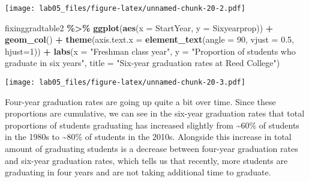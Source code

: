 \documentclass[
]{article}
\newenvironment{Shaded}{\begin{snugshade}}{\end{snugshade}}
\newcommand{\AttributeTok}[1]{\textcolor[rgb]{0.13,0.29,0.53}{#1}}
\newcommand{\DecValTok}[1]{\textcolor[rgb]{0.00,0.00,0.81}{#1}}
\newcommand{\FloatTok}[1]{\textcolor[rgb]{0.00,0.00,0.81}{#1}}
\newcommand{\FunctionTok}[1]{\textcolor[rgb]{0.13,0.29,0.53}{\textbf{#1}}}
\newcommand{\NormalTok}[1]{#1}
\newcommand{\SpecialCharTok}[1]{\textcolor[rgb]{0.81,0.36,0.00}{\textbf{#1}}}
\newcommand{\StringTok}[1]{\textcolor[rgb]{0.31,0.60,0.02}{#1}}
\begin{document}
\texttt{[image: lab05\_files/figure-latex/unnamed-chunk-20-2.pdf]}

\begin{Shaded}
\begin{Highlighting}[]
\NormalTok{fixinggradtable2 }\SpecialCharTok{\%\textgreater{}\%}
  \FunctionTok{ggplot}\NormalTok{(}\FunctionTok{aes}\NormalTok{(}\AttributeTok{x =}\NormalTok{ StartYear, }\AttributeTok{y =}\NormalTok{ Sixyearprop)) }\SpecialCharTok{+}
  \FunctionTok{geom\_col}\NormalTok{() }\SpecialCharTok{+}
  \FunctionTok{theme}\NormalTok{(}\AttributeTok{axis.text.x =} \FunctionTok{element\_text}\NormalTok{(}\AttributeTok{angle =} \DecValTok{90}\NormalTok{, }\AttributeTok{vjust =} \FloatTok{0.5}\NormalTok{, }\AttributeTok{hjust=}\DecValTok{1}\NormalTok{)) }\SpecialCharTok{+}
  \FunctionTok{labs}\NormalTok{(}\AttributeTok{x =} \StringTok{"Freshman class year"}\NormalTok{, }\AttributeTok{y =} \StringTok{"Proportion of students who graduate in six years"}\NormalTok{, }\AttributeTok{title =} \StringTok{"Six{-}year graduation rates at Reed College"}\NormalTok{) }
\end{Highlighting}
\end{Shaded}

\texttt{[image: lab05\_files/figure-latex/unnamed-chunk-20-3.pdf]}

Four-year graduation rates are going up quite a bit over time. Since
these proportions are cumulative, we can see in the six-year graduation
rates that total proportions of students graduating has increased
slightly from \textasciitilde60\% of students in the 1980s to
\textasciitilde80\% of students in the 2010s. Alongside this increase in
total amount of graduating students is a decrease between four-year
graduation rates and six-year graduation rates, which tells us that
recently, more students are graduating in four years and are not taking
additional time to graduate.
\end{document}
